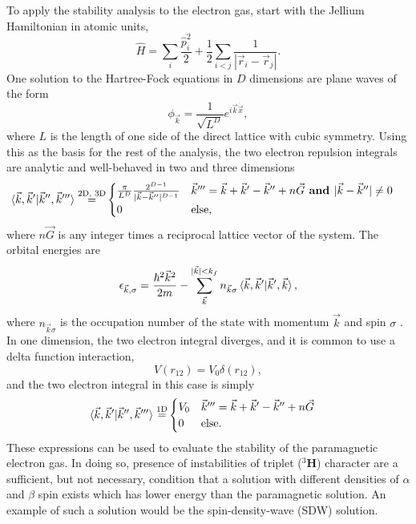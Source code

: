 \documentclass[preprint, journal=prl]{revtex4-1}
\begin{document}
  To apply the stability analysis to the electron gas, start with the Jellium Hamiltonian in atomic units, 
  \begin{equation}\label{hamiltonian}
   	\hat{H} = \sum_i \frac{\hat{p}_i^2}{2}  + \frac{1}{2} \sum_{i < j} \frac{1}{|\vec{r}_i - 
   	\vec{r}_j|}.
  \end{equation}
  One solution to the Hartree-Fock equations in $D$ dimensions are plane waves of the form	
  \begin{equation}\label{planewave}
   	\phi_{\vec{k}} =
    \frac{1} { \sqrt{L ^ D} } e ^ {i \vec{k} \dot \vec{x}},
  \end{equation}
  where $L$ is the length of one side of the direct lattice with cubic symmetry. Using this as the basis for the rest of the analysis, the two electron repulsion integrals are analytic and  well-behaved in two and three dimensions\cite{Delyon2008, Guiliani2005}
  \begin{align}
    \braket{\vec{k}, \vec{k}' | \vec{k}'', \vec{k}'''} 
    \stackrel{ \text{2D, 3D} }{=}&
    \begin{cases} 
      \frac{\pi} {L ^ D} \frac{ 2^{D-1} } { | \vec{k} - \vec{k}'' | ^ {D-1} } 
      & \vec{k}''' = \vec{k} + \vec{k}' - \vec{k}'' + n\vec{G} \textbf{ and } | \vec{k} - 
      \vec{k}''| \neq 0 \\
      0 
      & \text{else},
    \end{cases}
  \end{align}
  where $n\vec{G}$ is any integer times a reciprocal lattice vector of the system. The orbital energies are
  \begin{equation}\label{eq:hf_orb_energy}
    \epsilon_{\vec{k},\sigma}=
    \frac{\hbar^2\vec{k}^2}{2m} - \sum\limits_{\vec{k}}^{|\vec{k}|< 
    k_f}n_{\vec{k}\sigma}\braket{\vec{k}, \vec{k}' |\vec{k}', \vec{k}},
  \end{equation}
  where $n_{\vec{k}\sigma}$ is the occupation number of the state with momentum $\vec{k}$ and spin $\sigma$ \cite{Guiliani2005}. In one dimension, the two electron integral diverges, and it is common to use a delta function interaction, 
  \begin{equation}
    V(r_{12}) = V_0\delta(r_{12}),
  \end{equation}
  and the two electron integral in this case is simply
  \begin{align}\label{eq:ERI_1d}
    \braket{\vec{k}, \vec{k}' | \vec{k}'', \vec{k}'''} 
    \stackrel{ \text{1D} }{=}&
    \begin{cases} 
      V_0 
      & \vec{k}''' = \vec{k} + \vec{k}' - \vec{k}'' + n\vec{G}\\
      0 
      & \text{else}.
    \end{cases}
  \end{align}  
  These expressions can be used to evaluate the stability of the paramagnetic electron gas. In doing so, presence of instabilities of triplet (${}^3\mathbf{H}$) character are a sufficient, but not necessary, condition that a solution with different densities of $\alpha$ and $\beta$ spin exists which has lower energy than the paramagnetic solution. An example of such a solution would be the spin-density-wave (SDW) solution. 
   
\end{document}
